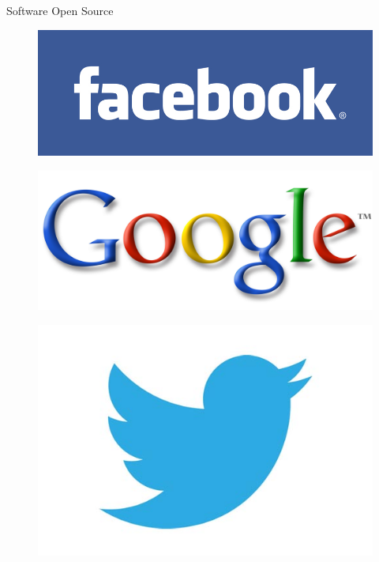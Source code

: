   \begin{frame}{Software Open Source}

   \begin{figure}[hb]
     \centering
     \includegraphics[scale=0.3]{facebook-logo.jpg}
     \label{fig11:fb}
   \end{figure}

   \begin{figure}[hb]
     \centering
     \includegraphics[scale=1]{google-logo.jpg}
     \label{fig12:goo}
   \end{figure}

   \begin{figure}[hb]
     \centering
     \includegraphics[scale=0.1]{new-twitter-logo.jpg}
     \label{fig13:twi}
   \end{figure}


\end{frame}
